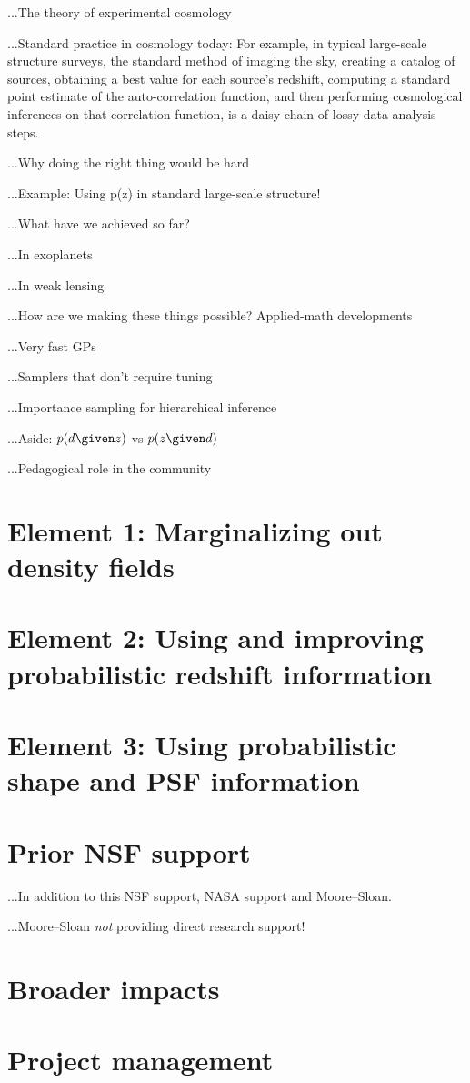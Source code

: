 \documentclass[12pt]{article}
\begin{document}
\sloppy\sloppypar

...The theory of experimental cosmology

...Standard practice in cosmology today:
For example, in typical large-scale structure surveys, the standard
method of imaging the sky, creating a catalog of sources, obtaining a
best value for each source's redshift, computing a standard point
estimate of the auto-correlation function, and then performing
cosmological inferences on that correlation function, is a daisy-chain
of lossy data-analysis steps.

...Why doing the right thing would be hard

...Example:  Using p(z) in standard large-scale structure!

...What have we achieved so far?

...In exoplanets

...In weak lensing

...How are we making these things possible?  Applied-math developments

...Very fast GPs

...Samplers that don't require tuning

...Importance sampling for hierarchical inference

...Aside:  $p(d\given z)$ vs $p(z\given d)$

...Pedagogical role in the community

\section*{Element 1: Marginalizing out density fields}

\section*{Element 2: Using and improving probabilistic redshift information}

\section*{Element 3: Using probabilistic shape and PSF information}

\section*{Prior NSF support}

...In addition to this NSF support, NASA support and Moore--Sloan.

...Moore--Sloan \emph{not} providing direct research support!

\section*{Broader impacts}

\section*{Project management}
\end{document}
